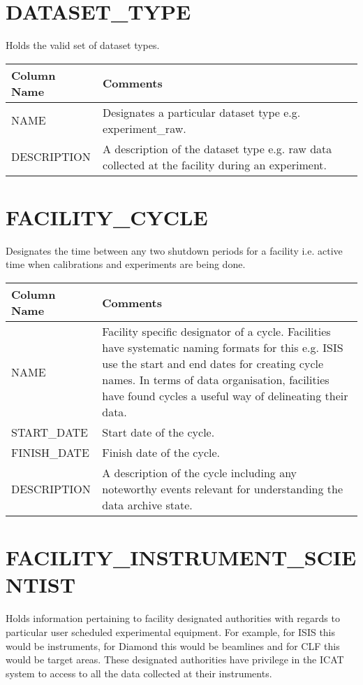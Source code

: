 \documentclass{report}
\begin{document}
\section{DATASET\_TYPE}

Holds the valid set of dataset types.\\

\begin{tabular}{|l|l|}
\hline
Column Name & Comments \\ \hline
NAME & \multicolumn{1}{p{100mm}|}{
Designates a particular dataset type e.g. experiment\_raw.} \\ \hline
DESCRIPTION & \multicolumn{1}{p{100mm}|}{
A description of the dataset type e.g. raw data collected at the facility during an experiment.} \\ \hline
\end{tabular}
\section{FACILITY\_CYCLE}

Designates the time between any two shutdown periods for a facility i.e. active time when calibrations and experiments are being done.\\

\begin{tabular}{|l|l|}
\hline
Column Name & Comments \\ \hline
NAME & \multicolumn{1}{p{100mm}|}{
Facility specific designator of a cycle. Facilities have systematic naming formats for this e.g. ISIS use the start and end dates for creating cycle names. In terms of data organisation, facilities have found cycles a useful way of delineating their data.} \\ \hline
START\_DATE & \multicolumn{1}{p{100mm}|}{
Start date of the cycle.} \\ \hline
FINISH\_DATE & \multicolumn{1}{p{100mm}|}{
Finish date of the cycle.} \\ \hline
DESCRIPTION & \multicolumn{1}{p{100mm}|}{
A description of the cycle including any noteworthy events relevant for understanding the data archive state.} \\ \hline
\end{tabular}
\section{FACILITY\_INSTRUMENT\_SCIENTIST}

Holds information pertaining to facility designated authorities with regards to particular user scheduled experimental equipment. For example, for ISIS this would be instruments, for Diamond this would be beamlines and for CLF this would be target areas. These designated authorities have privilege in the ICAT system to access to all the data collected at their instruments.\\
\end{document}
